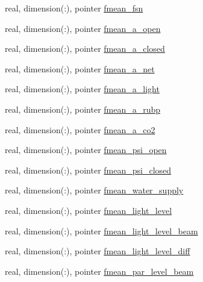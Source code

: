 \begin{DoxyCompactItemize}
real, dimension(\+:), pointer \hyperlink{structed__state__vars_1_1patchtype_a7134199921e2e440aef927097d43ed9d}{fmean\+\_\+fsn}
\item 
real, dimension(\+:), pointer \hyperlink{structed__state__vars_1_1patchtype_a70bf7501651d7a272a7ff4fae7239686}{fmean\+\_\+a\+\_\+open}
\item 
real, dimension(\+:), pointer \hyperlink{structed__state__vars_1_1patchtype_a64b2ee834aa785c5eb42a62bdfb158b4}{fmean\+\_\+a\+\_\+closed}
\item 
real, dimension(\+:), pointer \hyperlink{structed__state__vars_1_1patchtype_afe0fbcc7882f041a3bc75656a24be753}{fmean\+\_\+a\+\_\+net}
\item 
real, dimension(\+:), pointer \hyperlink{structed__state__vars_1_1patchtype_a70cc0e2ea56d3530b91e407e37f7c39e}{fmean\+\_\+a\+\_\+light}
\item 
real, dimension(\+:), pointer \hyperlink{structed__state__vars_1_1patchtype_a38a1e867f3929bd599401821f77a83a7}{fmean\+\_\+a\+\_\+rubp}
\item 
real, dimension(\+:), pointer \hyperlink{structed__state__vars_1_1patchtype_aa02693080a71051120780e20715c7a03}{fmean\+\_\+a\+\_\+co2}
\item 
real, dimension(\+:), pointer \hyperlink{structed__state__vars_1_1patchtype_a8770f8d9600532843c81a825c5f21688}{fmean\+\_\+psi\+\_\+open}
\item 
real, dimension(\+:), pointer \hyperlink{structed__state__vars_1_1patchtype_a2c10836059df40c8b563629dfa67b6ce}{fmean\+\_\+psi\+\_\+closed}
\item 
real, dimension(\+:), pointer \hyperlink{structed__state__vars_1_1patchtype_a05765d5aa97813c8ed8239f019207d37}{fmean\+\_\+water\+\_\+supply}
\item 
real, dimension(\+:), pointer \hyperlink{structed__state__vars_1_1patchtype_aea4d3a95dfc29d50dbcd8d1a7122ae15}{fmean\+\_\+light\+\_\+level}
\item 
real, dimension(\+:), pointer \hyperlink{structed__state__vars_1_1patchtype_a75db7ef722a70c116d0ebc5035009466}{fmean\+\_\+light\+\_\+level\+\_\+beam}
\item 
real, dimension(\+:), pointer \hyperlink{structed__state__vars_1_1patchtype_a629cfcc5909073e793e6b9285fbb1dba}{fmean\+\_\+light\+\_\+level\+\_\+diff}
\item 
real, dimension(\+:), pointer \hyperlink{structed__state__vars_1_1patchtype_a8915ec4b12cf2a822e236ea78cf58070}{fmean\+\_\+par\+\_\+level\+\_\+beam}
\item 

\end{DoxyCompactItemize}
